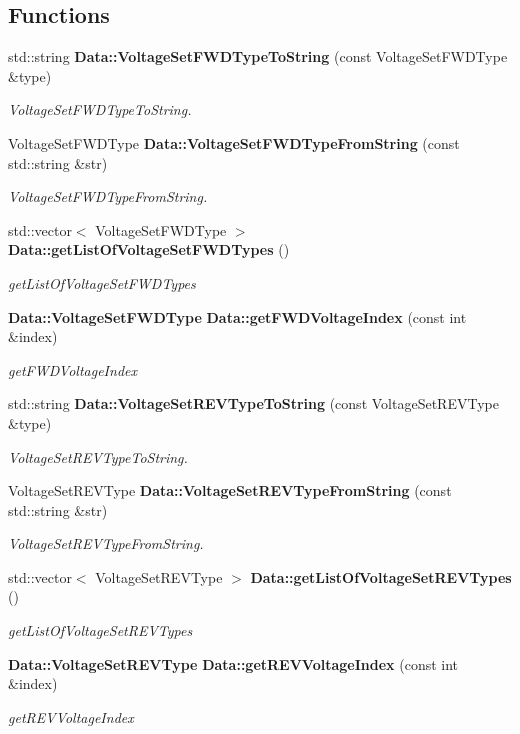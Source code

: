 \subsection*{Functions}
\begin{DoxyCompactItemize}
\item 
std\+::string \textbf{ Data\+::\+Voltage\+Set\+F\+W\+D\+Type\+To\+String} (const Voltage\+Set\+F\+W\+D\+Type \&type)
\begin{DoxyCompactList}\small\item\em Voltage\+Set\+F\+W\+D\+Type\+To\+String. \end{DoxyCompactList}\item 
Voltage\+Set\+F\+W\+D\+Type \textbf{ Data\+::\+Voltage\+Set\+F\+W\+D\+Type\+From\+String} (const std\+::string \&str)
\begin{DoxyCompactList}\small\item\em Voltage\+Set\+F\+W\+D\+Type\+From\+String. \end{DoxyCompactList}\item 
std\+::vector$<$ Voltage\+Set\+F\+W\+D\+Type $>$ \textbf{ Data\+::get\+List\+Of\+Voltage\+Set\+F\+W\+D\+Types} ()
\begin{DoxyCompactList}\small\item\em get\+List\+Of\+Voltage\+Set\+F\+W\+D\+Types \end{DoxyCompactList}\item 
\textbf{ Data\+::\+Voltage\+Set\+F\+W\+D\+Type} \textbf{ Data\+::get\+F\+W\+D\+Voltage\+Index} (const int \&index)
\begin{DoxyCompactList}\small\item\em get\+F\+W\+D\+Voltage\+Index \end{DoxyCompactList}\item 
std\+::string \textbf{ Data\+::\+Voltage\+Set\+R\+E\+V\+Type\+To\+String} (const Voltage\+Set\+R\+E\+V\+Type \&type)
\begin{DoxyCompactList}\small\item\em Voltage\+Set\+R\+E\+V\+Type\+To\+String. \end{DoxyCompactList}\item 
Voltage\+Set\+R\+E\+V\+Type \textbf{ Data\+::\+Voltage\+Set\+R\+E\+V\+Type\+From\+String} (const std\+::string \&str)
\begin{DoxyCompactList}\small\item\em Voltage\+Set\+R\+E\+V\+Type\+From\+String. \end{DoxyCompactList}\item 
std\+::vector$<$ Voltage\+Set\+R\+E\+V\+Type $>$ \textbf{ Data\+::get\+List\+Of\+Voltage\+Set\+R\+E\+V\+Types} ()
\begin{DoxyCompactList}\small\item\em get\+List\+Of\+Voltage\+Set\+R\+E\+V\+Types \end{DoxyCompactList}\item 
\textbf{ Data\+::\+Voltage\+Set\+R\+E\+V\+Type} \textbf{ Data\+::get\+R\+E\+V\+Voltage\+Index} (const int \&index)
\begin{DoxyCompactList}\small\item\em get\+R\+E\+V\+Voltage\+Index \end{DoxyCompactList}\end{DoxyCompactItemize}
